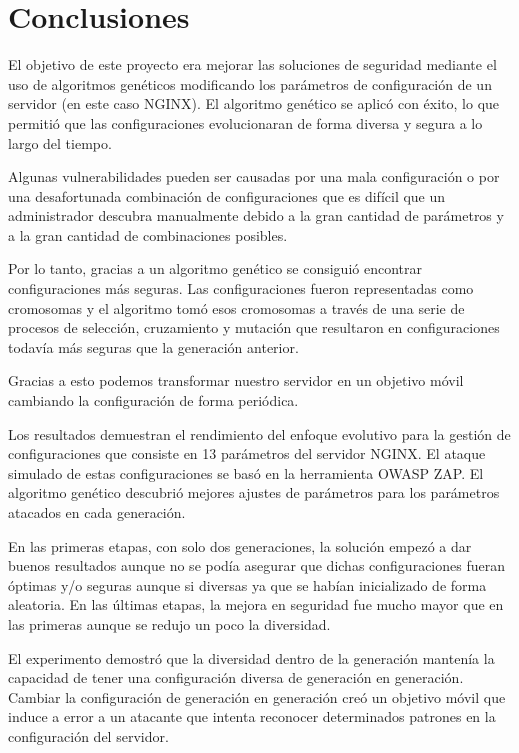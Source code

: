 \chapter{Conclusiones}

El objetivo de este proyecto era mejorar las soluciones de seguridad mediante el uso de algoritmos genéticos modificando los parámetros de configuración de un servidor (en este caso NGINX). El algoritmo genético se aplicó con éxito, lo que permitió que las configuraciones evolucionaran de forma diversa y segura a lo largo del tiempo.

\bigskip
Algunas vulnerabilidades pueden ser causadas por una mala configuración o por una desafortunada combinación de configuraciones que es difícil que un administrador descubra manualmente debido a la gran cantidad de parámetros y a la gran cantidad de combinaciones posibles.

\bigskip
Por lo tanto, gracias a un algoritmo genético se consiguió encontrar configuraciones más seguras. Las configuraciones fueron representadas como cromosomas y el algoritmo tomó esos cromosomas a través de una serie de procesos de selección, cruzamiento y mutación que resultaron en configuraciones todavía más seguras que la generación anterior.

\bigskip
Gracias a esto podemos transformar nuestro servidor en un objetivo móvil cambiando la configuración de forma periódica.

\bigskip
Los resultados demuestran el rendimiento del enfoque evolutivo para la gestión de configuraciones que consiste en 13 parámetros del servidor NGINX. El ataque simulado de estas configuraciones se basó en la herramienta OWASP ZAP. El algoritmo genético descubrió mejores ajustes de parámetros para los parámetros atacados en cada generación.

\bigskip
En las primeras etapas, con solo dos generaciones, la solución empezó a dar buenos resultados aunque no se podía asegurar que dichas configuraciones fueran óptimas y/o seguras aunque si diversas ya que se habían inicializado de forma aleatoria. En las últimas etapas, la mejora en seguridad fue mucho mayor que en las primeras aunque se redujo un poco la diversidad.

\bigskip
El experimento demostró que la diversidad dentro de la generación mantenía la capacidad de tener una configuración diversa de generación en generación. Cambiar la configuración de generación en generación creó un objetivo móvil que induce a error a un atacante que intenta reconocer determinados patrones en la configuración del servidor.


